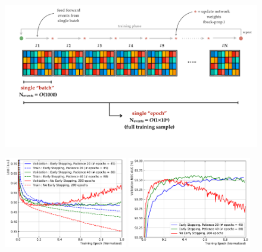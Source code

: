 \begin{figure}[!htb]
    \begin{center}
        \includegraphics[width=1.0\textwidth]{figures/search_hh/mva/nn_batchesPDF}
        \caption{
        }
        \label{fig:nn_batches}
    \end{center}
\end{figure}

\begin{figure}[!htb]
    \begin{center}
        \includegraphics[width=0.48\textwidth]{figures/search_hh/mva/overtrain_check_loss}
        \includegraphics[width=0.48\textwidth]{figures/search_hh/mva/overtrain_check_roc_auc}
        \caption{
        }
        \label{fig:nn_epoch_overtrain}
    \end{center}
\end{figure}

